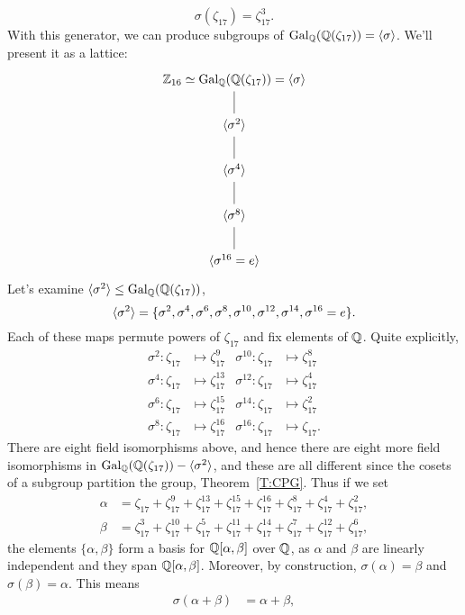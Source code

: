 \documentclass{ximera}
\begin{document}
\begin{example}
  \[
  \sigma(\zeta_{17}) = \zeta_{17}^3.
  \]
  With this generator, we can produce subgroups of
  $\operatorname{Gal}_\mathbb Q(\mathbb Q(\zeta_{17})) = \langle \sigma \rangle$. We'll present it as a
  lattice:
  \[
    \begin{tikzcd}
    \Z_{16}\iso\gal_\Q(\Q(\zeta_{17})) = \< \sigma \>\ar[d,-]\\
    \< \sigma^2\> \ar[d,-]\\
    \<\sigma^4\> \ar[d,-]\\
    \<\sigma^8\> \ar[d,-]\\
    \<\sigma^{16}=e\> 
  \end{tikzcd}
  \]
  Let's examine $\langle\sigma^2\rangle\leq \operatorname{Gal}_\mathbb Q(\mathbb Q(\zeta_{17}))$,
  \[
  \langle\sigma^2\rangle = \{ \sigma^2, \sigma^4,\sigma^6,\sigma^8,\sigma^{10},\sigma^{12},\sigma^{14},\sigma^{16} = e\}.
  \]
  Each of these maps permute powers of $\zeta_{17}$ and fix elements
  of $\mathbb Q$. Quite explicitly,
  \begin{align*}
    \sigma^2: \zeta_{17} &\mapsto \zeta_{17}^9    & \sigma^{10}: \zeta_{17} &\mapsto \zeta_{17}^{8}\\
    \sigma^4: \zeta_{17} &\mapsto \zeta_{17}^{13} & \sigma^{12}: \zeta_{17} &\mapsto \zeta_{17}^{4}\\
    \sigma^6: \zeta_{17} &\mapsto \zeta_{17}^{15} & \sigma^{14}: \zeta_{17} &\mapsto \zeta_{17}^{2}\\
    \sigma^8: \zeta_{17} &\mapsto \zeta_{17}^{16} & \sigma^{16}: \zeta_{17} &\mapsto \zeta_{17}.
  \end{align*}
  There are eight field isomorphisms above, and hence there are eight
  more field isomorphisms in $\operatorname{Gal}_\mathbb Q(\mathbb Q(\zeta_{17})) - \langle
  \sigma^2\rangle$, and these are all different since the cosets of a
  subgroup partition the group, Theorem~\ref{T:CPG}. Thus if we set 
  \begin{align*}
    \alpha &= \zeta_{17}   + \zeta_{17}^9 + \zeta_{17}^{13} + \zeta_{17}^{15} + \zeta_{17}^{16} + \zeta_{17}^{8} + \zeta_{17}^{4} + \zeta_{17}^{2},\\
    \beta &= \zeta_{17}^3 + \zeta_{17}^{10} + \zeta_{17}^{5} + \zeta_{17}^{11} + \zeta_{17}^{14} + \zeta_{17}^{7} + \zeta_{17}^{12} + \zeta_{17}^{6},
  \end{align*} 
  the elements $\{\alpha,\beta\}$ form a basis for $\mathbb Q[\alpha,\beta]$
  over $\mathbb Q$, as $\alpha$ and $\beta$ are linearly independent and they
  span $\mathbb Q[\alpha,\beta]$. Moreover, by construction, $\sigma(\alpha)
  = \beta$ and $\sigma(\beta) = \alpha$. This means
  \begin{align*}
    \sigma(\alpha+\beta) &= \alpha + \beta,\\

\end{align*}
\end{example}
\end{document}
